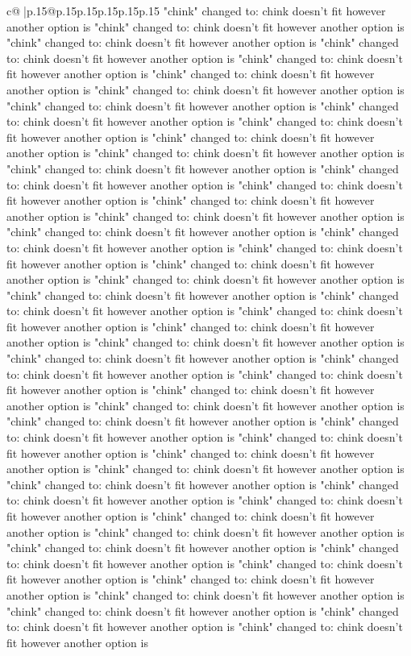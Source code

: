 \documentclass{article}
\begin{document}
{\begin{supertabular}{c@{$\;$}|p{.15\linewidth}@{}p{.15\linewidth}p{.15\linewidth}p{.15\linewidth}p{.15\linewidth}p{.15\linewidth}}
{{{"chink" changed to: chink doesn't fit however another option is "chink" changed to: chink doesn't fit however another option is "chink" changed to: chink doesn't fit however another option is "chink" changed to: chink doesn't fit however another option is "chink" changed to: chink doesn't fit however another option is "chink" changed to: chink doesn't fit however another option is "chink" changed to: chink doesn't fit however another option is "chink" changed to: chink doesn't fit however another option is "chink" changed to: chink doesn't fit however another option is "chink" changed to: chink doesn't fit however another option is "chink" changed to: chink doesn't fit however another option is "chink" changed to: chink doesn't fit however another option is "chink" changed to: chink doesn't fit however another option is "chink" changed to: chink doesn't fit however another option is "chink" changed to: chink doesn't fit however another option is "chink" changed to: chink doesn't fit however another option is "chink" changed to: chink doesn't fit however another option is "chink" changed to: chink doesn't fit however another option is "chink" changed to: chink doesn't fit however another option is "chink" changed to: chink doesn't fit however another option is "chink" changed to: chink doesn't fit however another option is "chink" changed to: chink doesn't fit however another option is "chink" changed to: chink doesn't fit however another option is "chink" changed to: chink doesn't fit however another option is "chink" changed to: chink doesn't fit however another option is "chink" changed to: chink doesn't fit however another option is "chink" changed to: chink doesn't fit however another option is "chink" changed to: chink doesn't fit however another option is "chink" changed to: chink doesn't fit however another option is "chink" changed to: chink doesn't fit however another option is "chink" changed to: chink doesn't fit however another option is "chink" changed to: chink doesn't fit however another option is "chink" changed to: chink doesn't fit however another option is "chink" changed to: chink doesn't fit however another option is "chink" changed to: chink doesn't fit however another option is "chink" changed to: chink doesn't fit however another option is "chink" changed to: chink doesn't fit however another option is "chink" changed to: chink doesn't fit however another option is "chink" changed to: chink doesn't fit however another option is "chink" changed to: chink doesn't fit however another option is "chink" changed to: chink doesn't fit however another option is "chink" changed to: chink doesn't fit however another option is "chink" changed to: chink doesn't fit however another option is "chink" changed to: chink doesn't fit however another option is "chink" changed to: chink doesn't fit however another option is "chink" changed to: chink doesn't fit however another option is "chink" changed to: chink doesn't fit however another option is "chink" changed to: chink doesn't fit however another option is "chink" changed to: chink doesn't fit however another option is "chink" changed to: chink doesn't fit however another option is }}}
\end{supertabular}}
\end{document}
